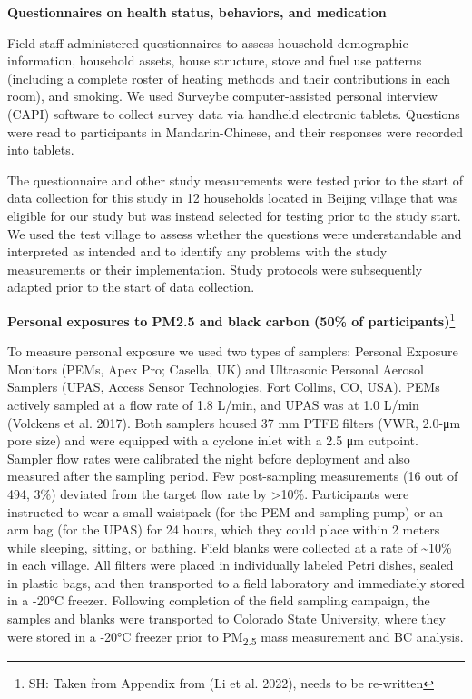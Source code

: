 \documentclass[
  letterpaper,
  DIV=11,
  numbers=noendperiod]{scrartcl}
\begin{document}
\textbf{Questionnaires on health status, behaviors, and medication}

Field staff administered questionnaires to assess household demographic
information, household assets, house structure, stove and fuel use
patterns (including a complete roster of heating methods and their
contributions in each room), and smoking. We used Surveybe
computer-assisted personal interview (CAPI) software to collect survey
data via handheld electronic tablets. Questions were read to
participants in Mandarin-Chinese, and their responses were recorded into
tablets.

The questionnaire and other study measurements were tested prior to the
start of data collection for this study in 12 households located in
Beijing village that was eligible for our study but was instead selected
for testing prior to the study start. We used the test village to assess
whether the questions were understandable and interpreted as intended
and to identify any problems with the study measurements or their
implementation. Study protocols were subsequently adapted prior to the
start of data collection.

\textbf{Personal exposures to PM2.5 and black carbon (50\% of
participants)}\footnote{SH: Taken from Appendix from (Li et al. 2022),
  needs to be re-written}

To measure personal exposure we used two types of samplers: Personal
Exposure Monitors (PEMs, Apex Pro; Casella, UK) and Ultrasonic Personal
Aerosol Samplers (UPAS, Access Sensor Technologies, Fort Collins, CO,
USA). PEMs actively sampled at a flow rate of 1.8 L/min, and UPAS was at
1.0 L/min (Volckens et al. 2017). Both samplers housed 37 mm PTFE
filters (VWR, 2.0-μm pore size) and were equipped with a cyclone inlet
with a 2.5 μm cutpoint. Sampler flow rates were calibrated the night
before deployment and also measured after the sampling period. Few
post-sampling measurements (16 out of 494, 3\%) deviated from the target
flow rate by \textgreater10\%. Participants were instructed to wear a
small waistpack (for the PEM and sampling pump) or an arm bag (for the
UPAS) for 24 hours, which they could place within 2 meters while
sleeping, sitting, or bathing. Field blanks were collected at a rate of
\textasciitilde10\% in each village. All filters were placed in
individually labeled Petri dishes, sealed in plastic bags, and then
transported to a field laboratory and immediately stored in a -20°C
freezer. Following completion of the field sampling campaign, the
samples and blanks were transported to Colorado State University, where
they were stored in a -20°C freezer prior to PM\textsubscript{2.5} mass
measurement and BC analysis.
\end{document}
